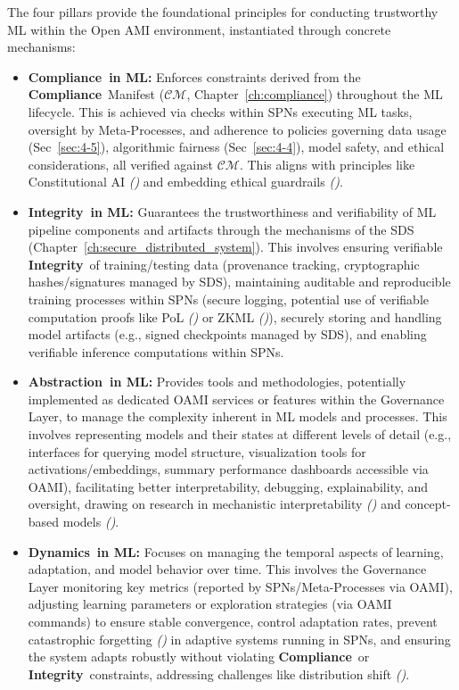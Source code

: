 \documentclass[12pt,a4paper]{report}
\renewcommand{\citep}[1]{\textit{\scriptsize{(\cite{#1})}}}
\newcommand{\Compliance}{\textbf{Compliance}}
\newcommand{\Integrity}{\textbf{Integrity}}
\newcommand{\Abstraction}{\textbf{Abstraction}}
\newcommand{\Dynamics}{\textbf{Dynamics}}
\begin{document}
	The four pillars provide the foundational principles for conducting trustworthy ML within the Open AMI environment, instantiated through concrete mechanisms:
	
	\begin{itemize}
		\item \textbf{\Compliance\ in ML:} Enforces constraints derived from the \Compliance\ Manifest ($\mathcal{CM}$, Chapter~\ref{ch:compliance}) throughout the ML lifecycle. This is achieved via checks within SPNs executing ML tasks, oversight by Meta-Processes, and adherence to policies governing data usage (Sec~\ref{sec:4-5}), algorithmic fairness (Sec~\ref{sec:4-4}), model safety, and ethical considerations, all verified against $\mathcal{CM}$. This aligns with principles like Constitutional AI \citep{Bai2022ConstitutionalAI} and embedding ethical guardrails \citep{Sekrst2024Guardrails}.
		\item \textbf{\Integrity\ in ML:} Guarantees the trustworthiness and verifiability of ML pipeline components and artifacts through the mechanisms of the SDS (Chapter~\ref{ch:secure_distributed_system}). This involves ensuring verifiable \Integrity\ of training/testing data (provenance tracking, cryptographic hashes/signatures managed by SDS), maintaining auditable and reproducible training processes within SPNs (secure logging, potential use of verifiable computation proofs like PoL \citep{Jia2021ProofOfLearning} or ZKML \citep{Peng2025ZKMLSurvey}), securely storing and handling model artifacts (e.g., signed checkpoints managed by SDS), and enabling verifiable inference computations within SPNs.
		\item \textbf{\Abstraction\ in ML:} Provides tools and methodologies, potentially implemented as dedicated OAMI services or features within the Governance Layer, to manage the complexity inherent in ML models and processes. This involves representing models and their states at different levels of detail (e.g., interfaces for querying model structure, visualization tools for activations/embeddings, summary performance dashboards accessible via OAMI), facilitating better interpretability, debugging, explainability, and oversight, drawing on research in mechanistic interpretability \citep{Anthropic_Decompose_2023} and concept-based models \citep{AdditionalCitationRef51}.
		\item \textbf{\Dynamics\ in ML:} Focuses on managing the temporal aspects of learning, adaptation, and model behavior over time. This involves the Governance Layer monitoring key metrics (reported by SPNs/Meta-Processes via OAMI), adjusting learning parameters or exploration strategies (via OAMI commands) to ensure stable convergence, control adaptation rates, prevent catastrophic forgetting \citep{Wang2024ContinualLearningSurvey, AdditionalCitationRef53} in adaptive systems running in SPNs, and ensuring the system adapts robustly without violating \Compliance\ or \Integrity\ constraints, addressing challenges like distribution shift \citep{AdditionalCitationRef53}.
	\end{itemize}
	
\end{document}
